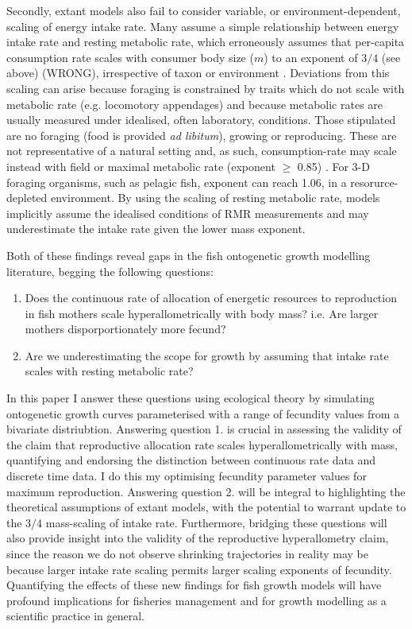 \documentclass[a4paper]{article} %
\begin{document}
    Secondly, extant models also fail to consider variable, or environment-dependent, scaling of energy intake rate. Many assume a simple relationship between energy intake rate and resting metabolic rate, which erroneously assumes that per-capita consumption rate scales with consumer body size ($m$) to an exponent of $3/4$ (see above) (WRONG), irrespective of taxon or environment \autocite{Pawar2012}. Deviations from this scaling can arise because foraging is constrained by traits which do not scale with metabolic rate (e.g. locomotory appendages) and because metabolic rates are usually measured under idealised, often laboratory, conditions. Those stipulated are no foraging (food is provided \textit{ad libitum}), growing or reproducing. These are not representative of a natural setting and, as such, consumption-rate may scale instead with field or maximal metabolic rate (exponent $\geq$ 0.85) \autocite{peters1983,Weibel2004, Pawar2012}. For 3-D foraging organisms, such as pelagic fish, exponent can reach 1.06, in a resorurce-depleted environment. By using the scaling of resting metabolic rate, models implicitly assume the idealised conditions of RMR measurements and may underestimate the intake rate given the lower mass exponent.
    
    Both of these findings reveal gaps in the fish ontogenetic growth modelling literature, begging the following questions:
    \begin{enumerate}
        \item Does the continuous rate of allocation of energetic resources to reproduction in fish mothers scale hyperallometrically with body mass? i.e. Are larger mothers disporportionately more fecund?
        \item Are we underestimating the scope for growth by assuming that intake rate scales with resting metabolic rate?
    \end{enumerate}
    In this paper I answer these questions using ecological theory by simulating ontogenetic growth curves parameterised with a range of fecundity values from a bivariate distriubtion. Answering question 1. is crucial in assessing the validity of the claim that reproductive allocation rate scales hyperallometrically with mass, quantifying and endorsing the distinction between continuous rate data and discrete time data. I do this my optimising fecundity parameter values for maximum reproduction. Answering question 2. will be integral to highlighting the theoretical assumptions of extant models, with the potential to warrant update to the $3/4$ mass-scaling of intake rate. Furthermore, bridging these questions will also provide insight into the validity of the reproductive hyperallometry claim, since the reason we do not observe shrinking trajectories in reality may be because larger intake rate scaling permits larger scaling exponents of fecundity. Quantifying the effects of these new findings for fish growth models will have profound implications for fisheries management and for growth modelling as a scientific practice in general.
\end{document}
